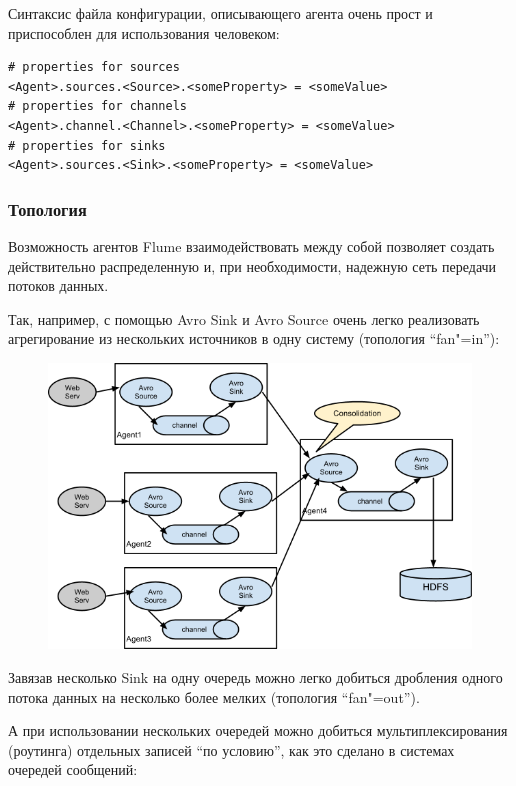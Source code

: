 \documentclass[10pt, a5paper]{article}
\begin{document}
Синтаксис файла конфигурации, описывающего агента очень прост и приспособлен для использования человеком:

\begin{verbatim}
# properties for sources 
<Agent>.sources.<Source>.<someProperty> = <someValue>
# properties for channels 
<Agent>.channel.<Channel>.<someProperty> = <someValue>
# properties for sinks 
<Agent>.sources.<Sink>.<someProperty> = <someValue> 
\end{verbatim}
\subsubsection*{Топология}

Возможность агентов Flume взаимодействовать между собой позволяет создать действительно распределенную и, при необходимости, надежную сеть передачи потоков данных.

Так, например, с помощью Avro Sink и Avro Source очень легко реализовать агрегирование из нескольких источников в одну систему (топология ``fan"=in''):


\begin{figure}[h!]
  \centering
  \includegraphics[scale=0.5]{21_2014_UserGuide_image02.png}
\end{figure}

Завязав несколько Sink на одну очередь можно легко добиться дробления одного потока данных на несколько более мелких (топология ``fan"=out'').

А при использовании нескольких очередей можно добиться мультиплексирования (роутинга) отдельных записей ``по условию'', как это сделано в системах очередей сообщений:
\end{document}
